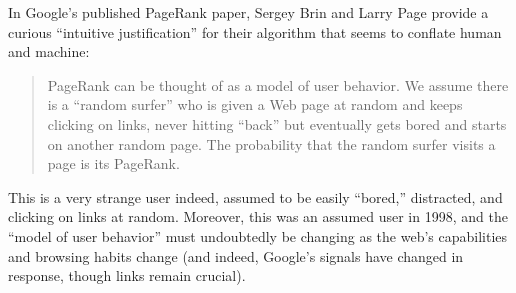 

In Google's published PageRank paper, Sergey Brin and Larry Page provide a curious ``intuitive justification'' for their algorithm that seems to conflate human and machine: \blockquote{PageRank can be thought of as a model of user behavior. We assume there is a ``random surfer'' who is given a Web page at random and keeps clicking on links, never hitting ``back'' but eventually gets bored and starts on another random page. The probability that the random surfer visits a page is its PageRank.\autocite[110]{brin_anatomy_1998}} This is a very strange user indeed, assumed to be easily ``bored,'' distracted, and clicking on links at random. Moreover, this was an assumed user in 1998, and the ``model of user behavior'' must undoubtedly be changing as the web's capabilities and browsing habits change (and indeed, Google's signals have changed in response, though links remain crucial).

